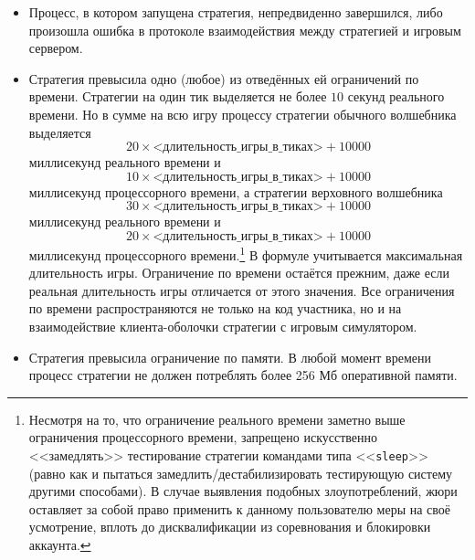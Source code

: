 \begin{itemize}
  \item Процесс, в котором запущена стратегия, непредвиденно завершился, либо произошла ошибка в протоколе взаимодействия между стратегией
        и игровым сервером.
  \item Стратегия превысила одно (любое) из отведённых ей ограничений по времени. Стратегии на один тик выделяется не более $10$ секунд
        реального времени. Но в сумме на всю игру процессу стратегии обычного волшебника выделяется
        \begin{equation}
        20\times\textit{<длительность\_игры\_в\_тиках>}+10000
        \end{equation}
        миллисекунд реального времени и
        \begin{equation}
        10\times\textit{<длительность\_игры\_в\_тиках>}+10000
        \end{equation}
        миллисекунд процессорного времени, а стратегии верховного волшебника
        \begin{equation}
        30\times\textit{<длительность\_игры\_в\_тиках>}+10000
        \end{equation}
        миллисекунд реального времени и
        \begin{equation}
        20\times\textit{<длительность\_игры\_в\_тиках>}+10000
        \end{equation}
        миллисекунд процессорного времени.\footnote[3]{Несмотря на то, что ограничение реального времени заметно выше ограничения
        процессорного времени, запрещено искусственно <<замедлять>> тестирование стратегии командами типа <<\texttt{sleep}>> (равно как и
        пытаться замедлить/дестабилизировать тестирующую систему другими способами). В случае выявления подобных злоупотреблений, жюри
        оставляет за собой право применить к данному пользователю меры на своё усмотрение, вплоть до дисквалификации из соревнования и
        блокировки аккаунта.} В формуле учитывается максимальная длительность игры. Ограничение по времени остаётся прежним, даже если
        реальная длительность игры отличается от этого значения. Все ограничения по времени распространяются не только на код участника, но
        и на взаимодействие клиента-оболочки стратегии с игровым симулятором.
  \item Стратегия превысила ограничение по памяти. В любой момент времени процесс стратегии не должен потреблять более 256 Мб оперативной
        памяти.
\end{itemize}

